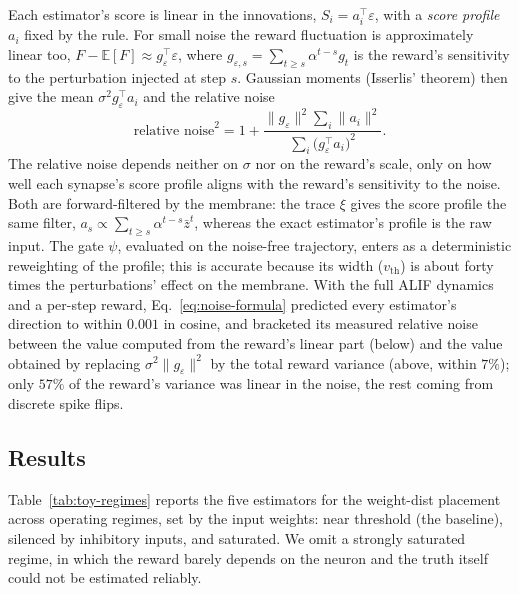 \documentclass[10pt,twocolumn]{article}
\begin{document}
Each estimator's score is linear in the innovations,
$S_i=a_i^{\top}\varepsilon$, with a \emph{score profile} $a_i$ fixed by the
rule. For small noise the reward fluctuation is approximately linear too,
$F-\mathbb E[F]\approx g_\varepsilon^{\top}\varepsilon$, where
$g_{\varepsilon,s}=\sum_{t\ge s}\alpha^{t-s}g_t$ is the reward's sensitivity to
the perturbation injected at step $s$. Gaussian moments (Isserlis' theorem)
then give the mean $\sigma^2 g_\varepsilon^{\top}a_i$ and the relative noise
\begin{equation}
\text{relative noise}^2
=1+\frac{\lVert g_\varepsilon\rVert^2\sum_i\lVert a_i\rVert^2}{\sum_i\big(g_\varepsilon^{\top}a_i\big)^2}.
\label{eq:noise-formula}
\end{equation}
The relative noise depends neither on $\sigma$ nor on the reward's scale, only
on how well each synapse's score profile aligns with the reward's sensitivity
to the noise. Both are forward-filtered by the membrane: the trace $\xi$ gives
the score profile the same filter, $a_s\propto\sum_{t\ge s}\alpha^{t-s}\bar z^t$,
whereas the exact estimator's profile is the raw input. The gate $\psi$,
evaluated on the noise-free trajectory, enters as a deterministic reweighting
of the profile; this is accurate because its width ($v_{\mathrm{th}}$) is about
forty times the perturbations' effect on the membrane. With the full ALIF
dynamics and a per-step reward, Eq.~\eqref{eq:noise-formula} predicted every
estimator's direction to within $0.001$ in cosine, and bracketed its measured
relative noise between the value computed from the reward's linear part
(below) and the value obtained by replacing $\sigma^2\lVert g_\varepsilon\rVert^2$
by the total reward variance (above, within $7\%$); only $57\%$ of the reward's
variance was linear in the noise, the rest coming from discrete spike flips.

\subsection{Results}
\label{app:trace-results}

Table~\ref{tab:toy-regimes} reports the five estimators for the weight-dist
placement across operating regimes, set by the input weights: near threshold
(the baseline), silenced by inhibitory inputs, and saturated. We omit a
strongly saturated regime, in which the reward barely depends on the neuron
and the truth itself could not be estimated reliably.
\end{document}
